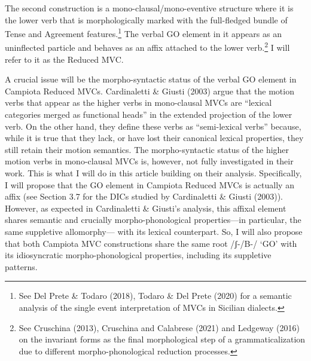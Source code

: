 \documentclass[output=paper,colorlinks,citecolor=brown,
]{langscibook}
\begin{document}
The second construction is a mono-clausal/mono-eventive structure where it is the lower verb that is morphologically marked with the full-fledged bundle of Tense and Agreement features.\footnote{See Del Prete \& Todaro (2018), Todaro \& Del Prete (2020) for a semantic analysis of the single event interpretation of MVCs in Sicilian dialects.}  The verbal GO element in it appears as an uninflected particle and behaves as an affix attached to the lower verb.\footnote{See Cruschina (2013), Cruschina and Calabrese (2021) and Ledgeway (2016) on the invariant forms as the final morphological step of a grammaticalization due to different morpho-phonological reduction processes.}  I will refer to it as the Reduced MVC.   

A crucial issue will be the morpho-syntactic status of the verbal GO element in Campiota Reduced MVCs. Cardinaletti \& Giusti (2003) argue that the motion verbs that appear as the higher verbs in mono-clausal MVCs are “lexical categories merged as functional heads” in the extended projection of the lower verb. On the other hand, they define these verbs as “semi-lexical verbs” because, while it is true that they lack, or have lost their canonical lexical properties, they still retain their motion semantics. The morpho-syntactic status of the higher motion verbs in mono-clausal MVCs is, however, not fully investigated in their work.  This is what I will do in this article building on their analysis.  Specifically, I will propose that the GO element in Campiota Reduced MVCs is actually an affix (see Section 3.7 for the DICs studied by Cardinaletti \& Giusti (2003)).  However, as expected in Cardinaletti \& Giusti’s analysis, this affixal element shares semantic and crucially morpho-phonological properties—in particular, the same suppletive allomorphy— with its lexical counterpart.  So, I will also propose that both Campiota MVC constructions share the same root /ʃ-/B-/ ‘GO’ with its idiosyncratic morpho-phonological properties, including its suppletive patterns. 
\end{document}
